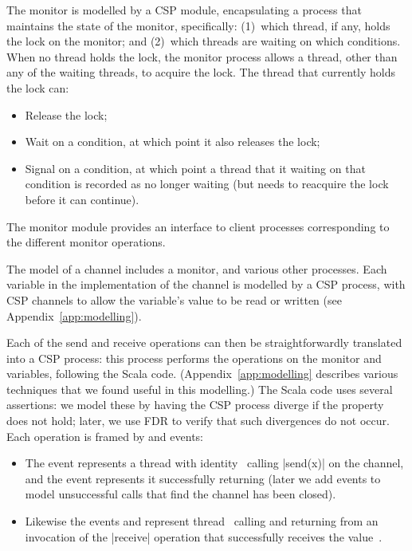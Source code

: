The monitor is modelled by a CSP module, encapsulating a process that
maintains the state of the monitor, specifically: (1)~which thread, if any,
holds the lock on the monitor; and (2)~which threads are waiting on which
conditions.  When no thread holds the lock, the monitor process allows a
thread, other than any of the waiting threads, to acquire the lock.  The
thread that currently holds the lock can:
\begin{itemize}
\item Release the lock;
\item Wait on a condition, at which point it also releases the lock;
\item Signal on a condition, at which point a thread that it waiting on that
  condition is recorded as no longer waiting (but needs to reacquire the lock
  before it can continue).
\end{itemize}
%
The monitor module provides an interface to client processes corresponding to
the different monitor operations.

The model of a channel includes a monitor, and various other processes.
Each variable in the implementation of the channel is modelled by a CSP
process, with CSP channels to allow the variable's value to be read or
written (see Appendix~\ref{app:modelling}).

Each of the send and receive operations can then be straightforwardly
translated into a CSP process: this process performs the operations on the
monitor and variables, following the Scala code.
(Appendix~\ref{app:modelling} describes various techniques that we found
useful in this modelling.)
%
The Scala code uses several assertions: we model these by having the CSP
process diverge if the property does not hold; later, we use FDR to verify
that such divergences do not occur.  
%
Each operation is framed by  and  events:
%
\begin{itemize}
\item The event  represents a thread with
  identity~ calling |send(x)| on the channel, and the event
   represents it successfully returning (later we
  add events to model unsuccessful calls that find the channel has
  been closed).

\item Likewise the events  and
   represent thread~ calling and
  returning from an invocation of the |receive| operation that successfully
  receives the value~.
\end{itemize}
%


